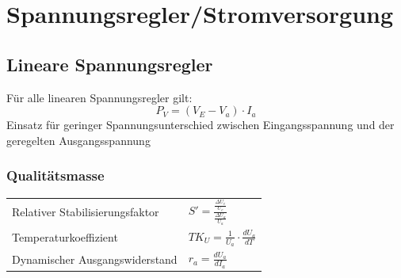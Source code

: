 \section{Spannungsregler/Stromversorgung} 
	\subsection{Lineare Spannungsregler} 
		Für alle linearen Spannungsregler gilt: 
		\begin{equation*}
			P_{V}=(V_{E}-V_{a}) \cdot I_{a}
		\end{equation*}
		Einsatz für geringer Spannungsunterschied zwischen Eingangsspannung und der
		geregelten Ausgangsspannung \\
		
		\subsubsection{Qualitätsmasse}
			\begin{tabular}{l l}
				Relativer Stabilisierungsfaktor & $S' = \frac{\frac{\Delta U_e}{U_e}}
														{\frac{\Delta U_a}{U_a}}$ \\
				Temperaturkoeffizient & $TK_U = \frac{1}{U_a} \cdot \frac{dU_a}{dT}$ \\
				Dynamischer Ausgangswiderstand & $r_a = \frac{dU_a}{dI_a}$ \\
			\end{tabular} \\

